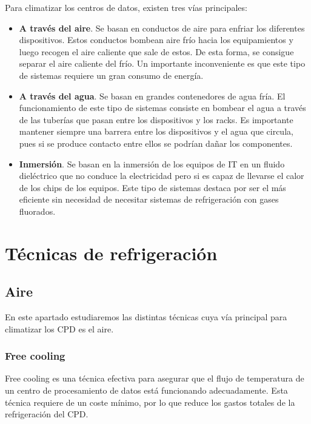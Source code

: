 Para climatizar los centros de datos, existen tres vías principales:

\begin{itemize}
    \item \textbf{A través del aire}. Se basan en conductos de aire para enfriar los diferentes dispositivos. Estos conductos bombean aire frío hacia los equipamientos y luego recogen el aire caliente que sale de estos. De esta forma, se consigue separar el aire caliente del frío. Un importante inconveniente es que este tipo de sistemas requiere un gran consumo de energía.
    \item \textbf{A través del agua}. Se basan en grandes contenedores de agua fría. El funcionamiento de este tipo de sistemas consiste en bombear el agua a través de las tuberías que pasan entre los dispositivos y los racks. Es importante mantener siempre una barrera entre los dispositivos y el agua que circula, pues si se produce contacto entre ellos se podrían dañar los componentes.
    \item \textbf{Inmersión}. Se basan en la inmersión de los equipos de IT en un fluido dieléctrico que no conduce la electricidad pero si es capaz de llevarse el calor de los chips de los equipos. Este tipo de sistemas destaca por ser el más eficiente sin necesidad de necesitar sistemas de refrigeración con gases fluorados.
\end{itemize}

\section{Técnicas de refrigeración}

\subsection{Aire}

En este apartado estudiaremos las distintas técnicas cuya vía principal para climatizar los CPD es el aire.

\subsubsection{Free cooling}

Free cooling es una técnica efectiva para asegurar que el flujo de temperatura de un centro de procesamiento de datos está funcionando adecuadamente. Esta técnica requiere de un coste mínimo, por lo que reduce los gastos totales de la refrigeración del CPD.

